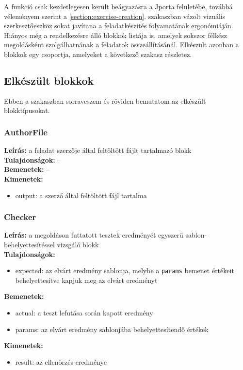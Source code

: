 A funkció csak kezdetlegesen került beágyazásra a Jporta felületébe, továbbá véleményem szerint a \ref{section:exercise-creation}. szakaszban vázolt vizuális szerkesztőeszköz sokat javítana a feladatkészítés folyamatának ergonómiáján.
Hiányos még a rendelkezésre álló blokkok listája is, amelyek sokszor félkész megoldásként szolgálhatnának a feladatok összeállításánál.
Elkészült azonban a blokkok egy csoportja, amelyeket a következő szakasz részletez.

\subsection{Elkészült blokkok}
Ebben a szakaszban sorraveszem és röviden bemutatom az elkészült blokktípusokat.

\subsubsection{AuthorFile}
\textbf{Leírás:} a feladat szerzője által feltöltött fájlt tartalmazó blokk \\
\textbf{Tulajdonságok:} -- \\
\textbf{Bemenetek:} -- \\
\textbf{Kimenetek:}
\begin{itemize}
    \item output: a szerző által feltöltött fájl tartalma
\end{itemize}
        
\subsubsection{Checker}
\textbf{Leírás:} a megoldáson futtatott tesztek eredményét egyszerű sablon-behelyettesítéssel vizsgáló blokk \\
\textbf{Tulajdonságok:}
\begin{itemize}
    \item expected: az elvárt eredmény sablonja, melybe a \texttt{params} bemenet értékeit behelyettesítve kapjuk meg az elvárt eredményt
\end{itemize}
\textbf{Bemenetek:}
\begin{itemize}
    \item actual: a teszt lefutása során kapott eredmény
    \item params: az elvárt eredmény sablonjába behelyettesítendő értékek
\end{itemize}
\textbf{Kimenetek:}
\begin{itemize}
    \item result: az ellenőrzés eredménye
\end{itemize}

